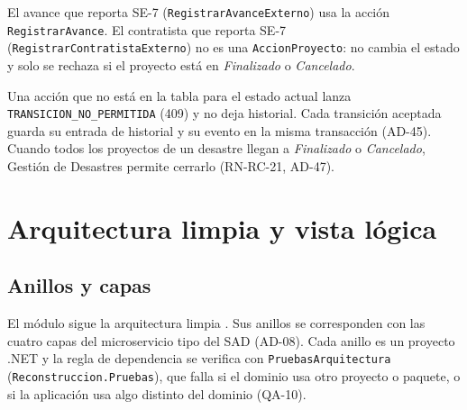 \documentclass[11pt,a4paper]{article}
\begin{document}
El avance que reporta SE-7 (\texttt{RegistrarAvanceExterno}) usa la acción \texttt{RegistrarAvance}. El contratista que
reporta SE-7 (\texttt{RegistrarContratistaExterno}) no es una \texttt{AccionProyecto}: no cambia el estado y solo se
rechaza si el proyecto está en \emph{Finalizado} o \emph{Cancelado}.

Una acción que no está en la tabla para el estado actual lanza \texttt{TRANSICION\_NO\_PERMITIDA} (409) y no deja
historial. Cada transición aceptada guarda su entrada de historial y su evento en la misma transacción (AD-45).
Cuando todos los proyectos de un desastre llegan a \emph{Finalizado} o \emph{Cancelado}, Gestión de Desastres
permite cerrarlo (RN-RC-21, AD-47).

\section{Arquitectura limpia y vista lógica}
\label{sec:logica}

\subsection{Anillos y capas}

El módulo sigue la arquitectura limpia \cite{martin}. Sus anillos se corresponden con las cuatro capas del microservicio tipo del
SAD (AD-08). Cada anillo es un proyecto .NET y la regla de dependencia se verifica con
\texttt{PruebasArquitectura} (\texttt{Reconstruccion.\allowbreak Pruebas}), que falla si el dominio usa otro proyecto o paquete,
o si la aplicación usa algo distinto del dominio (QA-10).
\end{document}
